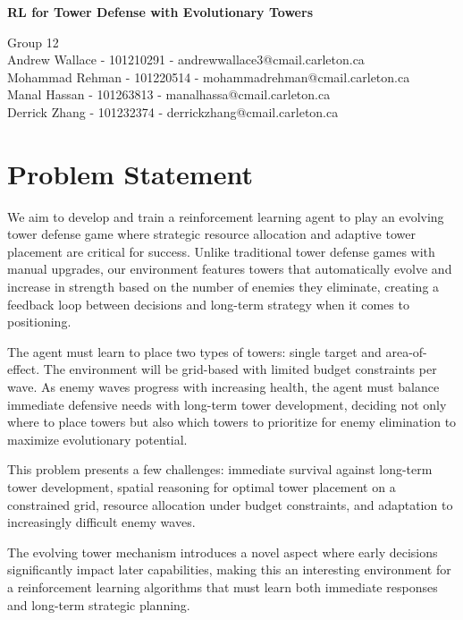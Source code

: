 \documentclass[12pt]{article}
\begin{document}
 

\begin{center} \Large\bf
RL for Tower Defense with Evolutionary Towers\\
\end{center} 

\begin{center}
Group 12 \\
Andrew Wallace - 101210291 - andrewwallace3@cmail.carleton.ca\\
Mohammad Rehman - 101220514 - mohammadrehman@cmail.carleton.ca \\
Manal Hassan - 101263813 - manalhassa@cmail.carleton.ca\\
Derrick Zhang - 101232374 - derrickzhang@cmail.carleton.ca
\end{center}
\newpage 

\section*{Problem Statement}
We aim to develop and train a reinforcement learning agent to play an evolving tower defense game where strategic resource allocation and adaptive tower placement are critical for success. Unlike traditional tower defense games with manual upgrades, our environment features towers that automatically evolve and increase in strength based on the number of enemies they eliminate, creating a feedback loop between decisions and long-term strategy when it comes to positioning.\par
The agent must learn to place two types of towers: single target and area-of-effect. The environment will be grid-based with limited budget constraints per wave. As enemy waves progress with increasing health, the agent must balance immediate defensive needs with long-term tower development, deciding not only where to place towers but also which towers to prioritize for enemy elimination to maximize evolutionary potential.\par

This problem presents a few challenges: immediate survival against long-term tower development, spatial reasoning for optimal tower placement on a constrained grid, resource allocation under budget constraints, and adaptation to increasingly difficult enemy waves. \par

The evolving tower mechanism introduces a novel aspect where early decisions significantly impact later capabilities, making this an interesting environment for a reinforcement learning algorithms that must learn both immediate responses and long-term strategic planning. \par
\end{document}
